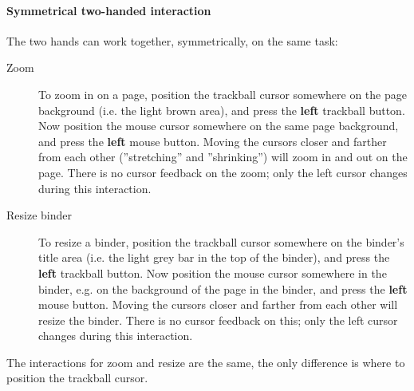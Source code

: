 \documentclass[12pt]{article}
\begin{document}
\paragraph{Symmetrical two-handed interaction}
The two hands can work together, symmetrically, on the same task:
\begin{description}
\item[Zoom] To zoom in on a page, position the trackball cursor
somewhere on the page background (i.e. the light brown area), and
press the \textbf{left} trackball button. Now position the mouse 
cursor somewhere on the same page background, and press the 
\textbf{left} mouse button. Moving the cursors closer and farther 
from each other (''stretching'' and ''shrinking'') will zoom in and 
out on the page. There is no cursor feedback on the zoom; only the 
left cursor changes during this interaction.
\item[Resize binder] To resize a binder, position the trackball 
cursor somewhere on the binder's title area (i.e. the light grey 
bar in the top of the binder), and press the \textbf{left} trackball
button. Now position the mouse cursor somewhere in the binder, e.g. 
on the background of the page in the binder, and press the 
\textbf{left} mouse button. Moving the cursors closer and farther 
from each other will resize the binder. There is no cursor feedback 
on this; only the left cursor changes during this interaction.
\end{description}
The interactions for zoom and resize are the same, the only difference
is where to position the trackball cursor. 

\label{endrapport}
\end{document}
